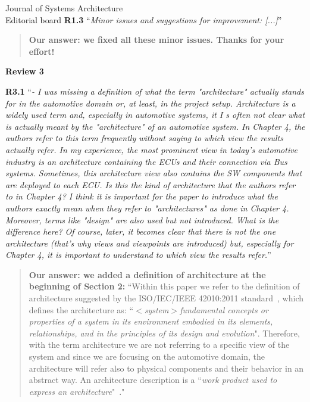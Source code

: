 \documentclass[a4paper,10pt]{letter}
\newcommand{\review}[1]{\hrulefill\par{\Large\textbf{Review #1}}}
\begin{document}
\begin{letter}{Journal of Systems Architecture\\
    Editorial board}
\textbf{R1.3} ``\textit{Minor issues and suggestions for improvement:
[...]}''
\begin{quote}
\textbf{Our answer: we fixed all these minor issues. Thanks for your effort!}
\end{quote}

\review{3}

\textbf{R3.1} ``\textit{- I was missing a definition of what the term "architecture" actually stands for in the automotive domain or, at least, in the project setup. Architecture is a widely used term and, especially in automotive systems, it I s often not clear what is actually meant by the "architecture" of an automotive system. In Chapter 4, the authors refer to this term frequently without saying to which view the results actually refer. In my experience, the most prominent view in today's automotive industry is an architecture containing the ECUs and their connection via Bus systems. Sometimes, this architecture view also contains the SW components that are deployed to each ECU. Is this the kind of architecture that the authors refer to in Chapter 4? I think it is important for the paper to introduce what the authors exactly mean when they refer to "architectures" as done in Chapter 4. Moreover, terms like "design" are also used but not introduced. What is the difference here? Of course,
later, it becomes clear that there is not the one architecture (that's why views and viewpoints are introduced) but, especially for Chapter 4, it is important to understand to which view the results refer.}''
\begin{quote}
\textbf{Our answer: we added a definition of architecture at the beginning of Section 2:}
``Within this paper we refer to the definition of architecture suggested by the ISO/IEC/IEEE 42010:2011 standard~\cite{42010}, which defines the architecture as: ``{\em $<$system$>$fundamental concepts or properties of a system in its environment embodied in its elements,
relationships, and in the principles of its design and evolution}". Therefore, with the term architecture we are not referring to a specific view of the system and since we are focusing on the automotive domain, the architecture will refer also to physical components and their behavior in an abstract way. An architecture description is a ``{\em work product used to express an architecture}"~\cite{42010}."
\end{quote}


\end{letter}
\end{document}
